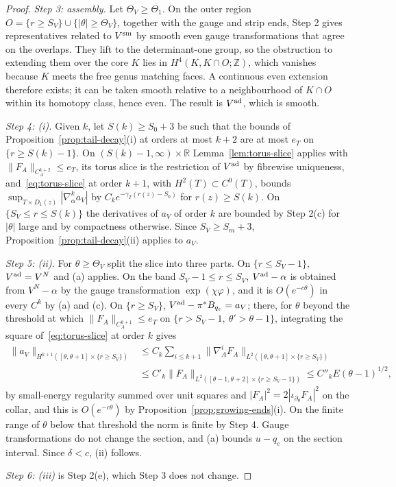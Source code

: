 \documentclass[11pt]{amsart}
\theoremstyle{definition}
\theoremstyle{remark}
\theoremstyle{plain}
\numberwithin{equation}{section}
\newcommand{\ZZ}{\mathbb{Z}}
\newcommand{\RR}{\mathbb{R}}
\begin{document}
\begin{proof}
\emph{Step 3: assembly.} Let $\Theta_V\ge\Theta_1$. On the outer region $O=\{r\ge S_V\}\cup\{|\theta|\ge\Theta_V\}$, together with
the gauge and strip ends, Step 2 gives representatives related to $V^{\rm sm}$ by smooth even
gauge transformations that agree on the overlaps. They lift to the determinant-one group, so
the obstruction to extending them over the core $K$ lies in $H^4(K,K\cap O;\ZZ)$, which vanishes
because $K$ meets the free genus matching faces. A continuous even extension therefore
exists; it can be taken smooth relative to a neighbourhood of $K\cap O$ within its homotopy
class, hence even. The result is $V^{\rm ad}$, which is smooth.

\emph{Step 4: (i).} Given $k$, let $S(k)\ge S_0+3$ be such that the bounds of
Proposition~\ref{prop:tail-decay}(i) at orders at most $k+2$ are at most $e_T$ on
$\{r\ge S(k)-1\}$. On $(S(k)-1,\infty)\times\RR$
Lemma~\ref{lem:torus-slice} applies with $\|F_A\|_{C^{k+2}_A}\le e_T$, its torus slice is the
restriction of $V^{\rm ad}$ by fibrewise uniqueness, and~\eqref{eq:torus-slice} at order $k+1$,
with $H^2(T)\subset C^0(T)$, bounds $\sup_{T\times D_1(z)}|\nabla^k_\alpha a_V|$ by
$C_ke^{-\gamma_T(r(z)-S_0)}$ for $r(z)\ge S(k)$. On $\{S_V\le r\le S(k)\}$ the derivatives of $a_V$ of
order $k$ are bounded by Step 2(c) for $|\theta|$ large and by compactness otherwise. Since
$S_V\ge S_m+3$, Proposition~\ref{prop:tail-decay}(ii) applies to $a_V$.

\emph{Step 5: (ii).} For $\theta\ge\Theta_V$ split the slice into three parts. On $\{r\le S_V-1\}$,
$V^{\rm ad}=V^N$ and (a) applies. On the band $S_V-1\le r\le S_V$, $V^{\rm ad}-\alpha$ is obtained from
$V^N-\alpha$ by the gauge transformation $\exp(\chi\varphi)$, and it is $O(e^{-c\theta})$ in every $C^k$ by (a)
and (c). On $\{r\ge S_V\}$, $V^{\rm ad}-\pi^*B_{q_e}=a_V$; there, for $\theta$ beyond the threshold at
which $\|F_A\|_{C^{k+1}_A}\le e_T$ on $\{r>S_V-1,\ \theta'>\theta-1\}$, integrating the square
of~\eqref{eq:torus-slice} at order $k$ gives
\begin{align*}
\|a_V\|_{H^{k+1}([\theta,\theta+1]\times\{r\ge S_V\})}&\le C_k\sum_{i\le k+1}\|\nabla^i_AF_A\|_{L^2([\theta,\theta+1]\times\{r\ge S_V\})}\\
&\le C'_k\|F_A\|_{L^2([\theta-1,\theta+2]\times\{r\ge S_V-1\})}\le C''_kE(\theta-1)^{1/2},
\end{align*}
by small-energy regularity summed over unit squares and $|F_A|^2=2|\iota_{\partial_\theta}F_A|^2$ on the
collar, and this is $O(e^{-c\theta})$ by Proposition~\ref{prop:growing-ends}(i). On the finite
range of $\theta$ below that threshold the norm is finite by Step 4. Gauge transformations do
not change the section, and (a) bounds $u-q_e$ on the section interval. Since $\delta<c$, (ii)
follows.

\emph{Step 6: (iii)} is Step 2(e), which Step 3 does not change.
\end{proof}
\end{document}
